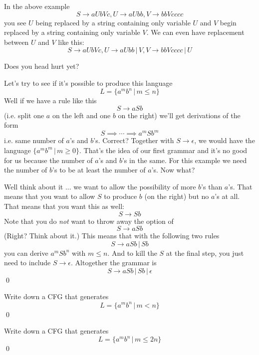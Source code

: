 In the above example
\[
S \rightarrow aUbVc, U \rightarrow aUbb, V \rightarrow bbVcccc
\]
you see $U$ being replaced by a string containing only variable $U$
and $V$ begin replaced by a string containing only variable $V$.
We can even have replacement between $U$ and $V$ like this:
\[
S \rightarrow aUbVc, U \rightarrow aUbb\,|\, V, V \rightarrow bbVcccc\,|\, U
\]

Does you head hurt yet?




\newpage
\begin{eg}
Let's try to see if it's possible to produce this language
\[
L = \{a^m b^n \,|\, m \leq n\}
\]
Well if we have a rule like this
\[
S \rightarrow aSb
\]
(i.e. split one $a$ on the left and one $b$ on the right) we'll get
derivations of the form
\[
S \implies \cdots \implies a^mSb^m
\]
i.e. same number of $a$'s and $b$'s. 
Correct?
Together with $S \rightarrow \epsilon$, we would have the language
$\{a^mb^m \,|\, m \geq 0\}$.
That's the idea of our first grammar and
it's no good for us because the number of $a$'s and $b$'s
in the same. For this example we need the number of $b$'s to be
at least the number of $a$'s.
Now what?

Well think about it ... we want to allow the possibility of more $b$'s
than $a$'s.
That means that you want to allow $S$ to produce $b$ (on the right)
but no $a$'s at all.
That means that you want this as well:
\[
S \rightarrow Sb
\]
Note that you do \textit{ not} want to throw away the option of 
\[
S \rightarrow aSb
\]
(Right? Think about it.)
This means that with the following two rules
\[
S \rightarrow aSb \,|\, Sb
\]
you can derive $a^mSb^n$ with $m \leq n$.
And to kill the $S$ at the final step,
you just need to include $S \rightarrow \epsilon$.
Altogether the grammar is 
\[
S \rightarrow aSb \,|\, Sb \,|\, \epsilon
\]
\qed
\end{eg}




\begin{ex}
Write down a CFG that generates
\[
L = \{a^m b^n \,|\, m < n\}
\]
\qed
\end{ex}
\vspace{2in}




\begin{ex}
Write down a CFG that generates
\[
L = \{a^m b^n \,|\, m \leq 2n\}
\]
\qed
\end{ex}
\vspace{2in}




